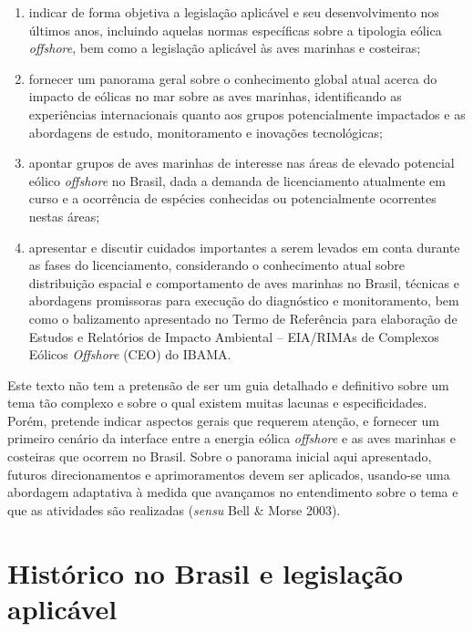 \documentclass[
  oneside]{scrbook}
\begin{document}
\begin{enumerate}
\def\labelenumi{\arabic{enumi}.}
\item
  indicar de forma objetiva a legislação aplicável e seu desenvolvimento nos últimos anos, incluindo aquelas normas específicas sobre a tipologia eólica \emph{offshore}, bem como a legislação aplicável às aves marinhas e costeiras;
\item
  fornecer um panorama geral sobre o conhecimento global atual acerca do impacto de eólicas no mar sobre as aves marinhas, identificando as experiências internacionais quanto aos grupos potencialmente impactados e as abordagens de estudo, monitoramento e inovações tecnológicas;
\item
  apontar grupos de aves marinhas de interesse nas áreas de elevado potencial eólico \emph{offshore} no Brasil, dada a demanda de licenciamento atualmente em curso e a ocorrência de espécies conhecidas ou potencialmente ocorrentes nestas áreas;
\item
  apresentar e discutir cuidados importantes a serem levados em conta durante as fases do licenciamento, considerando o conhecimento atual sobre distribuição espacial e comportamento de aves marinhas no Brasil, técnicas e abordagens promissoras para execução do diagnóstico e monitoramento, bem como o balizamento apresentado no Termo de Referência para elaboração de Estudos e Relatórios de Impacto Ambiental -- EIA/RIMAs de Complexos Eólicos \emph{Offshore} (CEO) do IBAMA.
\end{enumerate}

Este texto não tem a pretensão de ser um guia detalhado e definitivo sobre um tema tão complexo e sobre o qual existem muitas lacunas e especificidades. Porém, pretende indicar aspectos gerais que requerem atenção, e fornecer um primeiro cenário da interface entre a energia eólica \emph{offshore} e as aves marinhas e costeiras que ocorrem no Brasil. Sobre o panorama inicial aqui apresentado, futuros direcionamentos e aprimoramentos devem ser aplicados, usando-se uma abordagem adaptativa à medida que avançamos no entendimento sobre o tema e que as atividades são realizadas (\emph{sensu} Bell \& Morse 2003).

\hypertarget{histuxf3rico-no-brasil-e-legislauxe7uxe3o-aplicuxe1vel}{%
\section{Histórico no Brasil e legislação aplicável}\label{histuxf3rico-no-brasil-e-legislauxe7uxe3o-aplicuxe1vel}}
\end{document}
